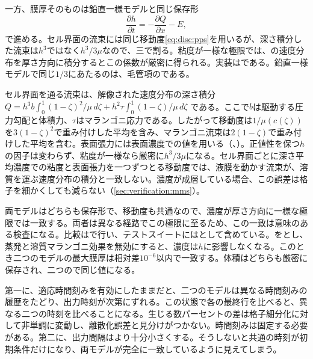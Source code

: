一方、膜厚そのものは鉛直一様モデルと同じ保存形
%
\begin{equation}
  \frac{\partial h}{\partial t} = -\frac{\partial Q}{\partial x} - E ,
  \label{eq:disc:cz-conservative}
\end{equation}
%
で進める。セル界面の流束には同じ移動度\cref{eq:disc:pps}を用いるが、深さ積分した流束は$h^{3}$ではなく$h^{3}/3\mu$なので、三で割る。粘度が一様な極限では、の速度分布を厚さ方向に積分するとこの係数が厳密に得られる。実装はである。鉛直一様モデルで同じ$1/3$にあたるのは、毛管項のである。

\begin{note}[セル界面での解像された粘度]
セル界面を通る流束は、解像された速度分布の深さ積分
$Q = h^3 b\int_0^1 (1-\zeta)^2/\mu\,d\zeta + h^2\tau\int_0^1 (1-\zeta)/\mu\,d\zeta$
である。ここで$b$は駆動する圧力勾配と体積力、$\tau$はマランゴニ応力である。したがって移動度は$1/\mu(c(\zeta))$を$3(1-\zeta)^2$で重み付けした平均を含み、マランゴニ流束は$2(1-\zeta)$で重み付けした平均を含む。表面張力には表面濃度での値を用いる（、）。正値性を保つ$h$の因子は変わらず、粘度が一様なら厳密に$h^3/3\mu$になる。セル界面ごとに深さ平均濃度での粘度と表面張力を一つずつとる移動度では、液膜を動かす流束が、溶質を運ぶ速度分布の積分と一致しない。濃度が成層している場合、この誤差は格子を細かくしても減らない（\cref{sec:verification:mms}）。
\end{note}

両モデルはどちらも保存形で、移動度も共通なので、濃度が厚さ方向に一様な極限では一致する。両者は異なる経路でこの極限に至るため、この一致は意味のある検査になる。比較はで行い、テストスイートにはとして含めている。をとし、蒸発と溶質マランゴニ効果を無効にすると、濃度は$h$に影響しなくなる。このとき二つのモデルの最大膜厚は相対差$10^{-6}$以内で一致する。体積はどちらも厳密に保存され、二つので同じ値になる。

\begin{note}[この比較での二つの落とし穴]
第一に、適応時間刻みを有効にしたままだと、二つのモデルは異なる時間刻みの履歴をたどり、出力時刻が次第にずれる。この状態で各の最終行を比べると、異なる二つの時刻を比べることになる。生じる数パーセントの差は格子細分化に対して非単調に変動し、離散化誤差と見分けがつかない。時間刻みは固定する必要がある。第二に、出力間隔はより十分小さくする。そうしないと共通の時刻が初期条件だけになり、両モデルが完全に一致しているように見えてしまう。
\end{note}

